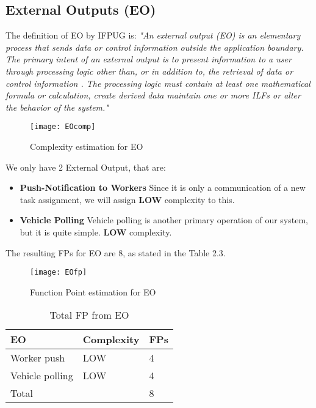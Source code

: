 \subsection{External Outputs (EO)}
The definition of EO by IFPUG is: \bigbreak
\textit{"An external output (EO) is an elementary process that sends data or control information outside the application boundary. The primary intent of an external output is to present information to a user through processing logic other than, or in addition to, the retrieval of data or control information . The processing logic must contain at least one mathematical formula or calculation, create derived data maintain one or more ILFs or alter the behavior of the system."}
\bigbreak
\begin{figure}
  \centering
  \texttt{[image: EOcomp]}
  \caption{Complexity estimation for EO}
\end{figure}
We only have 2 External Output, that are:
\begin{itemize}
\item \textbf{Push-Notification to Workers} Since it is only a communication of a new task assignment, we will assign \textbf{LOW} complexity to this.
\item \textbf{Vehicle Polling} Vehicle polling is another primary operation of our system, but it is quite simple. \textbf{LOW} complexity.
\end{itemize}

The resulting FPs for EO are 8, as stated in the Table 2.3.

\begin{figure}
  \centering
  \texttt{[image: EOfp]}
  \caption{Function Point estimation for EO}
\end{figure}

\begin{table}
  \centering
    \begin{tabular}{| l | l | l |}
    \hline
    \textbf{EO} & \textbf{Complexity} & \textbf{FPs} \\ \hline
    Worker push & LOW & 4 \\ \hline
    Vehicle polling & LOW & 4\\ \hline
    \hline
    \multicolumn{2}{|l|}{Total} & 8 \\ \hline
    \end{tabular}
  \caption{Total FP from EO}
\end{table}

